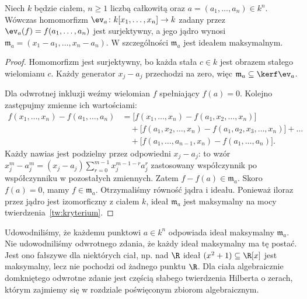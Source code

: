 \begin{stwierdzenie}
\label{st:eval-point}
Niech $k$ będzie ciałem, $n\ge1$ liczbą całkowitą
oraz $a=(a_1,\dots,a_n)\in k^n$. Wówczas homomorfizm
$\ev_a\colon k[x_1,\dots,x_n]\to k$ zadany przez
$\ev_a(f)=f(a_1,\dots,a_n)$ jest surjektywny, a jego jądro wynosi
$\mathfrak m_a=(x_1-a_1,\dots,x_n-a_n)$.
W szczególności $\mathfrak m_a$ jest ideałem maksymalnym.
\end{stwierdzenie}
\begin{proof}
Homomorfizm jest surjektywny, bo każda stała $c\in k$
jest obrazem stałego wielomianu $c$. Każdy generator $x_j-a_j$
przechodzi na zero, więc
$\mathfrak m_a\subseteq\kerf\ev_a$.

Dla odwrotnej inkluzji weźmy wielomian $f$ spełniający $f(a)=0$.
Kolejno zastępujmy zmienne ich wartościami:
\begin{align*}
 f(x_1,\dots,x_n)-f(a_1,\dots,a_n)
 &=\bigl[f(x_1,\dots,x_n)-f(a_1,x_2,\dots,x_n)\bigr]\\
 &\quad+\bigl[f(a_1,x_2,\dots,x_n)-f(a_1,a_2,x_3,\dots,x_n)\bigr]
 +\dots\\
 &\quad+\bigl[f(a_1,\dots,a_{n-1},x_n)-f(a_1,\dots,a_n)\bigr].
\end{align*}
Każdy nawias jest podzielny przez odpowiedni $x_j-a_j$:
to wzór $x_j^m-a_j^m=(x_j-a_j)\sum_{r=0}^{m-1}x_j^{m-1-r}a_j^r$
zastosowany współczynnik po współczynniku w pozostałych zmiennych.
Zatem $f-f(a)\in\mathfrak m_a$. Skoro $f(a)=0$,
mamy $f\in\mathfrak m_a$. Otrzymaliśmy równość jądra i ideału.
Ponieważ iloraz przez jądro jest izomorficzny z ciałem $k$,
ideał $\mathfrak m_a$ jest maksymalny na mocy
 twierdzenia~\ref{tw:kryterium}.
\end{proof}

\begin{uwaga}
Udowodniliśmy, że każdemu punktowi $a\in k^n$ odpowiada ideał
maksymalny $\mathfrak m_a$. Nie udowodniliśmy odwrotnego zdania,
że każdy ideał maksymalny ma tę postać. Jest ono fałszywe dla
niektórych ciał, np. nad $\R$ ideał $(x^2+1)\subseteq\R[x]$
jest maksymalny, lecz nie pochodzi od żadnego punktu $\R$.
Dla ciała algebraicznie domkniętego odwrotne zdanie jest częścią
słabego twierdzenia Hilberta o zerach, którym zajmiemy się
w rozdziale poświęconym zbiorom algebraicznym.
\end{uwaga}

